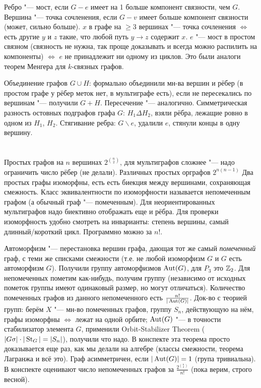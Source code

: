 Ребро "--- мост, если $G-e$ имеет на 1 больше компонент связности, чем $G$.
Вершина "--- точка сочленения, если $G-v$ имеет больше компонент связности (может, сильно больше).
$x$ в графе на $\ge 3$ вершинах "--- точка сочленения $\iff$ есть другие $y$ и $z$ такие, что любой путь $y\to z$ содержит $x$.
$e$ "--- мост в простом связном (связность не нужна, так проще доказывать и всегда можно распилить на компоненты) $\iff$ $e$ не принадлежит ни одному из циклов.
Это были аналоги теорем Менгера для $k$-связных графов.

Объединение графов $G\cup H$: формально объединили мн-ва вершин и рёбер (в простом графе у рёбер меток нет, в мультиграфе есть), если не пересекались по вершинам "--- получили $G+H$.
Пересечение "--- аналогично.
Симметрическая разность остовных подграфов графа $G$: $H_1 \Delta H_2$, взяли рёбра, лежащие ровно в одном из $H_1$, $H_2$.
Стягивание ребра: $G \backslash e$, удалили $e$, стянули концы в одну вершину.

\section{} %
Простых графов на $n$ вершинах $2^{\binom{n}{2}}$, для мультиграфов сложнее "--- надо ограничить число рёбер (не делали).
Различных простых орграфов $2^{n(n-1)}$
Два простых графы изоморфны, есть есть биекция между вершинами, сохраняющая смежность.
Класс эквивалентности по изоморфности называется непомеченным графом (а обычный граф "--- помеченным).
Для неориентированных мультиграфов надо биективно отображать еще и рёбра.
Для проверки изоморфность удобно смотреть на инварианты: степень вершины, самый длинный/короткий цикл.
Программно можно за $n!$.

Автоморфизм "--- перестановка вершин графа, дающая тот же самый \textit{помеченный} граф, с теми же списками смежности (т.е. не любой изоморфизм $G$ и $G$ есть автоморфизм $G$).
Получили группу автоморфизмов $\operatorname{Aut}(G)$, для $P_3$ это $\mathbb{Z}_2$.
Для непомеченных пометим как-нибудь, получим группу (независимо от исходных пометок группы имеют одинаковый размер, но могут отличаться).
Количество помеченных графов из данного непомеченного есть $\frac{n!}{|\operatorname{Aut}(G)|}$.
Док-во с теорией групп: берём $X$ "--- мн-во помеченных графов, группу $S_n$, действующую на нём, графы изоморфны $\iff$ лежат на одной орбите;
$\operatorname{Aut}(G)$ "--- в точности стабилизатор элемента $G$, применили Orbit-Stabilizer Theorem ($|G\sigma| \cdot |\operatorname{St}_G| = |S_n|$), получили что надо.
В конспекте эта теорема просто доказывается еще раз, как мы делали на алгебре (классы смежности, теорема Лагранжа и всё это).
Граф асимметричен, если $|\operatorname{Aut}(G)|=1$ (група тривиальна).
В конспекте оценивают число непомеченных графов за $\frac{2^{\binom{n}{2}}}{n!}$ (пока верим, строго весной).
